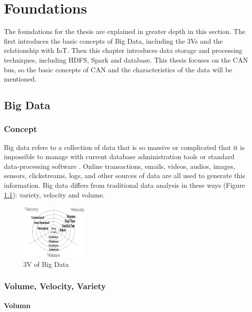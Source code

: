 \chapter{Foundations}
\label{ch:basics}
The foundations for the thesis are explained in greater depth in this section. The first introduces the basic concepts of Big Data, including the 3Vs and the relationship with IoT. Then this chapter introduces data storage and processing techniques, including HDFS, Spark and database. This thesis focuses on the CAN bus, so the basic concepts of CAN and the characteristics of the data will be mentioned. 


\section{Big Data}
\subsection{Concept}
Big data refers to a collection of data that is so massive or complicated that it is impossible to manage with current database administration tools or standard data-processing software \cite{7888916}. Online transactions, emails, videos, audios, images, sensors, clickstreams, logs, and other sources of data are all used to generate this information\cite[p.~13]{10.5555/2132803}. Big data differs from traditional data analysis in these ways (Figure \ref{fig:big_data}): variety, velocity and volume\cite{6567202}.

\begin{figure}[hbt!]
    \centering
    \includegraphics[width=0.3\textwidth]{gfx/big_data.png}
    \caption{3V of Big Data\cite{6567202}}
    \label{fig:big_data}
\end{figure}

\subsection{Volume, Velocity, Variety}

\subsubsection{Volumn}

